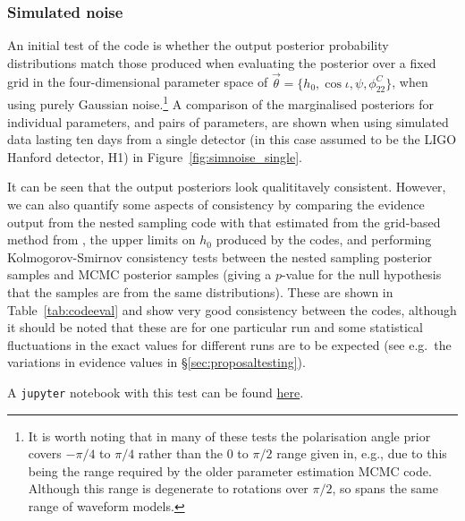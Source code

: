 \subsubsection{Simulated noise}\label{sec:simnoise}

An initial test of the code is whether the output posterior probability distributions match those produced when evaluating the
posterior over a fixed grid in the four-dimensional parameter space of $\vec{\theta} = \{h_0, \cos{\iota}, \psi, \phi_{22}^C\}$, when
using purely Gaussian noise.\footnote{It is worth noting that in many of these tests the polarisation angle prior covers $-\pi/4$ to $\pi/4$
rather than the 0 to $\pi/2$ range given in, e.g., \citet{2015MNRAS.453.4399P} due to this being the range required by the older
parameter estimation MCMC code. Although this range is degenerate to rotations over $\pi/2$, so spans the same range of waveform models.}
A comparison of the marginalised posteriors for individual parameters, and pairs of parameters, are shown when using simulated data lasting
ten days from a single detector (in this case assumed to be the LIGO Hanford detector, H1) in Figure~\ref{fig:simnoise_single}.

It can be seen that the output posteriors look qualititavely consistent. However, we can also quantify some aspects of consistency by
comparing the evidence output from the nested sampling code with that estimated from the grid-based method from \lppe, the upper limits
on $h_0$ produced by the codes, and performing Kolmogorov-Smirnov consistency tests between the nested sampling posterior samples
and MCMC posterior samples (giving a $p$-value for the null hypothesis that the samples are from the same distributions).
These are shown in Table~\ref{tab:codeeval} and show very good consistency between the codes, although it should be noted that
these are for one particular run and some statistical fluctuations in the exact values for different runs are to be expected (see e.g.\
the variations in evidence values in \S\ref{sec:proposaltesting}).

A {\tt jupyter} notebook with this test can be found \href{https://github.com/mattpitkin/CW_nested_sampling_doc/blob/master/figures/codeeval/simulations/noise/SimulatedNoiseTestsPaper.ipynb}{here}.

